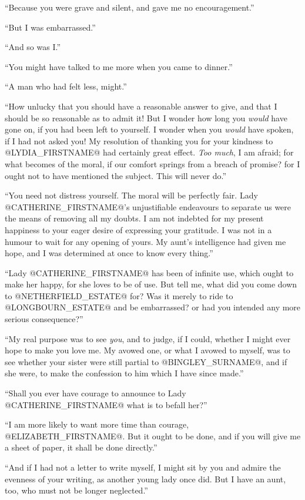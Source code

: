 ``Because you were grave and silent, and gave me no encouragement.''

``But I was embarrassed.''

``And so was I.''

``You might have talked to me more when you came to dinner.''

``A man who had felt less, might.''

``How unlucky that you should have a reasonable answer to give, and that
I should be so reasonable as to admit it! But I wonder how long you
\textit{would} have gone on, if you had been left to yourself. I wonder when
you \textit{would} have spoken, if I had not asked you! My resolution of
thanking you for your kindness to @LYDIA_FIRSTNAME@ had certainly great effect.
\textit{Too much}, I am afraid; for what becomes of the moral, if our comfort
springs from a breach of promise? for I ought not to have mentioned the
subject. This will never do.''

``You need not distress yourself. The moral will be perfectly fair. Lady
@CATHERINE_FIRSTNAME@'s unjustifiable endeavours to separate us were the means of
removing all my doubts. I am not indebted for my present happiness to
your eager desire of expressing your gratitude. I was not in a humour
to wait for any opening of yours. My aunt's intelligence had given me
hope, and I was determined at once to know every thing.''

``Lady @CATHERINE_FIRSTNAME@ has been of infinite use, which ought to make her happy,
for she loves to be of use. But tell me, what did you come down to
@NETHERFIELD_ESTATE@ for? Was it merely to ride to @LONGBOURN_ESTATE@ and be embarrassed?
or had you intended any more serious consequence?''

``My real purpose was to see \textit{you}, and to judge, if I could, whether I
might ever hope to make you love me. My avowed one, or what I avowed to
myself, was to see whether your sister were still partial to @BINGLEY_SURNAME@,
and if she were, to make the confession to him which I have since made.''

``Shall you ever have courage to announce to Lady @CATHERINE_FIRSTNAME@ what is to
befall her?''

``I am more likely to want more time than courage, @ELIZABETH_FIRSTNAME@. But it
ought to be done, and if you will give me a sheet of paper, it shall be
done directly.''

``And if I had not a letter to write myself, I might sit by you and
admire the evenness of your writing, as another young lady once did. But
I have an aunt, too, who must not be longer neglected.''

